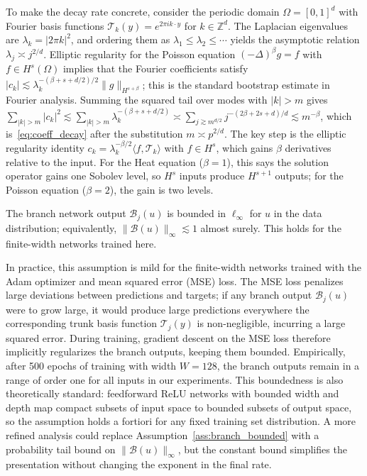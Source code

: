 \documentclass[12pt,a4paper]{article}
\begin{document}
To make the decay rate concrete, consider the periodic domain $\Omega = [0,1]^d$
with Fourier basis functions $\mathcal{T}_k(y) = e^{2\pi i k \cdot y}$ for
$k \in \mathbb{Z}^d$.  The Laplacian eigenvalues are $\lambda_k = |2\pi k|^2$,
and ordering them as $\lambda_1 \leq \lambda_2 \leq \cdots$ yields the
asymptotic relation $\lambda_j \asymp j^{2/d}$.  Elliptic regularity for the
Poisson equation $(-\Delta)^{\beta} g = f$ with $f \in H^{s}(\Omega)$ implies
that the Fourier coefficients satisfy $|c_k| \lesssim \lambda_k^{-(\beta+s+d/2)/2}
\|g\|_{H^{s+\beta}}$; this is the standard bootstrap estimate in Fourier analysis.
Summing the squared tail over modes with $|k| > m$ gives
$\sum_{|k|>m} |c_k|^2 \lesssim \sum_{|k|>m} \lambda_k^{-(\beta+s+d/2)}
\asymp \sum_{j \gtrsim m^{d/2}} j^{-(2\beta+2s+d)/d}
\lesssim m^{-\beta}$, which is~\eqref{eq:coeff_decay} after the substitution
$m \asymp p^{2/d}$.  The key step is the elliptic regularity identity
$c_k = \lambda_k^{-\beta/2} \langle f, \mathcal{T}_k \rangle$ with
$f \in H^{s}$, which gains $\beta$ derivatives relative to the input.
For the Heat equation ($\beta=1$), this says the solution operator gains one
Sobolev level, so $H^s$ inputs produce $H^{s+1}$ outputs; for the Poisson
equation ($\beta=2$), the gain is two levels.

\begin{assump}
    \label{ass:branch_bounded}
    The branch network output $\mathcal{B}_j(u)$ is bounded in $\ell_\infty$
    for $u$ in the data distribution; equivalently,
    $\|\mathcal{B}(u)\|_\infty \lesssim 1$ almost surely.
    This holds for the finite-width networks trained here.
\end{assump}

In practice, this assumption is mild for the finite-width networks trained
with the Adam optimizer and mean squared error (MSE) loss.  The MSE loss
penalizes large deviations between predictions and targets; if any branch
output $\mathcal{B}_j(u)$ were to grow large, it would produce large predictions
everywhere the corresponding trunk basis function $\mathcal{T}_j(y)$ is non-negligible,
incurring a large squared error.  During training, gradient descent on the MSE
loss therefore implicitly regularizes the branch outputs, keeping them bounded.
Empirically, after 500 epochs of training with width $W=128$, the branch outputs
remain in a range of order one for all inputs in our experiments.  This boundedness
is also theoretically standard: feedforward ReLU networks with bounded width and
depth map compact subsets of input space to bounded subsets of output space, so
the assumption holds a fortiori for any fixed training set distribution.  A more
refined analysis could replace Assumption~\ref{ass:branch_bounded} with a
probability tail bound on $\|\mathcal{B}(u)\|_\infty$, but the constant bound
simplifies the presentation without changing the exponent in the final rate.
\end{document}
